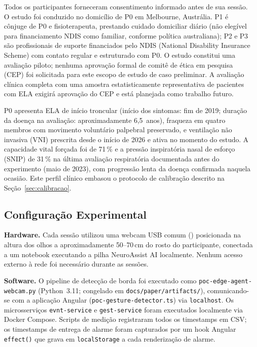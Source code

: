 Todos os participantes forneceram consentimento informado antes de sua sessão. O
estudo foi conduzido no domicílio de P0 em Melbourne, Austrália. P1 é cônjuge de P0
e fisioterapeuta, prestando cuidado domiciliar diário (não elegível para financiamento
NDIS como familiar, conforme política australiana); P2 e P3 são profissionais de suporte
financiados pelo NDIS (National Disability Insurance Scheme) com contato regular e
estruturado com P0.
O estudo constitui uma avaliação piloto; nenhuma aprovação formal de comitê de ética
em pesquisa (CEP) foi solicitada para este escopo de estudo de caso preliminar. A avaliação clínica completa com uma amostra
estatisticamente representativa de pacientes com ELA exigirá aprovação do CEP e está
planejada como trabalho futuro.

P0 apresenta ELA de início troncular (início dos sintomas: fim de 2019; duração da
doença na avaliação: aproximadamente 6,5~anos), fraqueza em quatro membros com
movimento voluntário palpebral preservado, e ventilação não invasiva (VNI) prescrita
desde o início de 2026 e ativa no momento do estudo. A capacidade vital forçada foi de
71\,\% e a pressão inspiratória nasal de esforço (SNIP) de 31\,\% na última avaliação
respiratória documentada antes do experimento (maio de 2023), com progressão lenta da
doença confirmada naquela ocasião.  Este perfil clínico
embasou o protocolo de calibração descrito na Seção~\ref{sec:calibracao}.

\subsection{Configuração Experimental}
\label{sec:configuracao}

\textbf{Hardware.} Cada sessão utilizou uma webcam USB comum
() posicionada na altura
dos olhos a aproximadamente 50--70\,cm do rosto do participante, conectada a um
notebook executando a pilha NeuroAssist AI localmente. Nenhum acesso externo à rede
foi necessário durante as sessões.

\textbf{Software.} O pipeline de detecção de borda foi executado como
\texttt{poc-edge-agent-webcam.py} (Python~3.11; congelado em \texttt{docs/paper/artifacts/}), comunicando-se com a aplicação
Angular (\texttt{poc-gesture-detector.ts}) via \texttt{localhost}. Os microsserviços
\texttt{evnt-service} e \texttt{gest-service} foram executados localmente via Docker
Compose. Scripts de medição registraram todos os timestamps em CSV; os timestamps de
entrega de alarme foram capturados por um hook Angular \texttt{effect()} que grava
em \texttt{localStorage} a cada renderização de alarme.

